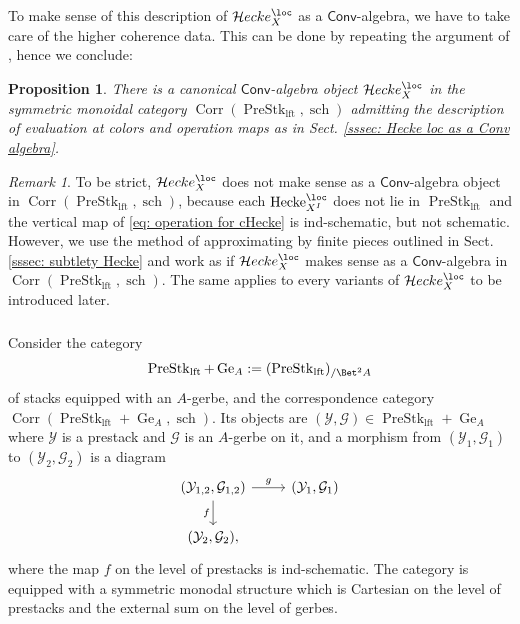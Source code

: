 \documentclass[10pt]{amsart}
\newcommand{\sssec}{\subsubsection}
\newtheorem{prop}[subsubsection]{Proposition}
\theoremstyle{remark}
\newtheorem{rmk}[subsubsection]{Remark}
\newcommand{\on}{\operatorname}
\newcommand{\cG}{\mathcal{G}}
\newcommand{\cY}{\mathcal{Y}}
\newcommand{\PreStklft}{\on{PreStk}_{\on{lft}}}
\newcommand{\Hecke}{\on{Hecke}}
\newcommand{\Conv}{\mathsf{Conv}}
\newcommand{\cHecke}{\mathcal{H}ecke}
\newcommand{\Corr}{\on{Corr}}
\begin{document}
To make sense of this description of $\cHecke^{\loc}_X$ as a $\Conv$-algebra, we have to take care of the higher coherence data. This can be done by repeating the argument of \cite[Sect. 1.2.7]{ZhaoNew}, hence we conclude:
\begin{prop}
    There is a canonical $\Conv$-algebra object $\cHecke^{\loc}_X$ in the symmetric monoidal category $\Corr(\PreStklft, \on{sch})$ admitting the description of evaluation at colors and operation maps as in Sect. \ref{sssec: Hecke loc as a Conv algebra}.
\end{prop}

\begin{rmk}
    To be strict, $\cHecke^{\loc}_X$ does not make sense as a $\Conv$-algebra object in $\Corr(\PreStklft,\on{sch})$, because each $\Hecke^{\loc}_{X^I}$ does not lie in $\PreStklft$ and the vertical map of \eqref{eq: operation for cHecke} is ind-schematic, but not schematic. However, we use the method of approximating by finite pieces outlined in Sect. \ref{sssec: subtlety Hecke} and work as if $\cHecke^{\loc}_{X}$ makes sense as a $\Conv$-algebra in $\Corr(\PreStklft,\on{sch})$. The same applies to every variants of $\cHecke^{\loc}_X$ to be introduced later.
\end{rmk}

\sssec{}\label{sssec: local Hecke Conv algebra in Stk Ge}
Consider the category \[\PreStklft+\on{Ge}_A:= (\PreStklft)_{/\Bet^2 A}\] 
of stacks equipped with an $A$-gerbe, and the correspondence category $\Corr(\PreStklft+\on{Ge}_A, \on{sch})$. Its objects are $(\cY,\cG)\in\PreStklft+\on{Ge}_A$ where $\cY$ is a prestack and $\cG$ is an $A$-gerbe on it, and a morphism from $(\cY_1,\cG_1)$ to $(\cY_2,\cG_2)$ is a diagram
\begin{equation}\label{eq: morphism Corr PreStk Ge}
    \begin{tikzcd}
	{(\cY_{1,2},\cG_{1,2})} & {(\cY_1,\cG_1)} \\
	{(\cY_2,\cG_2),}
	\arrow["g", from=1-1, to=1-2]
	\arrow["f"', from=1-1, to=2-1]
\end{tikzcd}
\end{equation}
where the map $f$ on the level of prestacks is ind-schematic. The category is equipped with a symmetric monodal structure which is Cartesian on the level of prestacks and the external sum on the level of gerbes.
\end{document}
